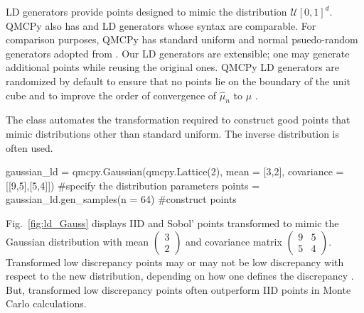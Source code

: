 \documentclass[11pt]{NSFamsart}
\newcommand{\calu}{{\mathcal{U}}}
\newcommand{\hmu}{\hat{\mu}}
\begin{document}
LD generators provide points designed to mimic the distribution $\calu[0,1]^d$.  QMCPy also has  \cite{DicPil10a} and  \cite{Hal60} LD generators whose syntax are comparable.
For comparison purposes, QMCPy  has standard uniform and normal psuedo-random generators adopted from .  Our LD generators are extensible;  one may generate additional points while reusing the original ones.   QMCPy LD generators are randomized by default to ensure that no points lie on the boundary of the unit cube and to improve the order of convergence of $\hmu_n$ to $\mu$ \cite{Owe97}.

The  class automates the transformation required to construct good points that mimic distributions other than standard uniform.  The  inverse  distribution is often used.
\begin{pythoncode}
gaussian_ld = qmcpy.Gaussian(qmcpy.Lattice(2), mean = [3,2], covariance = [[9,5],[5,4]])  #specify the distribution parameters
points = gaussian_ld.gen_samples(n = 64)  #construct points
\end{pythoncode}

Fig.\ \ref{fig:ld_Gauss} displays  IID and Sobol' points  transformed to mimic the Gaussian distribution with mean $\begin{pmatrix} 3 \\ 2 \end{pmatrix}$ and covariance matrix $\begin{pmatrix} 9 & 5 \\ 5 & 4 \end{pmatrix}$.  Transformed low discrepancy points may or may not be low discrepancy with respect to the new distribution, depending on how one defines the discrepancy \cite{LiKanHic20a}.  But, transformed low discrepancy points often outperform IID points in Monte Carlo calculations.

\end{document}
